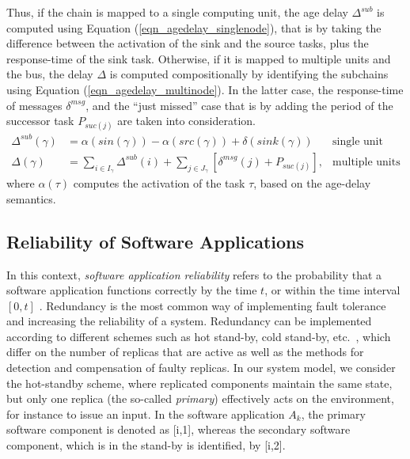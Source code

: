 Thus, if the chain is mapped to a single computing unit, the age delay  $\Delta^{sub}$ is computed using Equation (\ref{eqn_agedelay_singlenode}), that is by taking the difference between the activation of the sink and the source tasks, plus the response-time of the sink task. Otherwise, if it is mapped to multiple units and the bus, the delay $\Delta$ is computed compositionally by identifying the subchains using Equation (\ref{eqn_agedelay_multinode}). In the latter case, the response-time of messages $\delta^{msg}$, and the ``just missed'' case that is by adding the period of the successor task $P_{suc(j)}$ are  taken into consideration.
\begin{align}
	\label{eqn_agedelay_singlenode}
	\Delta^{sub}(\gamma) &= \alpha(sin(\gamma))-\alpha(src(\gamma)) + \delta(sink(\gamma)) & \text{single unit}\\
	\label{eqn_agedelay_multinode}
	\Delta(\gamma)&=\sum_{i\in I_{\gamma}}{\Delta^{sub}(i)} + \sum_{j\in  J_{\gamma}}{[\delta^{msg}(j)+P_{suc(j)}]}, &\text{multiple units}
\end{align}
where $\alpha(\tau)$ computes the activation of the task $\tau$, based on the age-delay semantics.

\subsection{Reliability of Software Applications}\label{sub_reliability}
In this context, \textit{software application reliability} refers to the probability that a software application functions correctly by the time $t$, or within the time interval $[0, t]$ \cite{Goel1985SoftwareApplicability}. Redundancy is the most common way of implementing fault tolerance and increasing the reliability of a system. Redundancy can be implemented according to different schemes such as hot stand-by, cold stand-by, etc.~\cite{Dubrova2013Fault-tolerantDesign}, which differ on the number of replicas that are active as well as the methods for detection and compensation of faulty replicas. In our system model, we consider the hot-standby scheme, where replicated components maintain the same state, but only one replica (the so-called \textit{primary}) effectively acts on the environment, for instance to issue an input. In the software application $A_k$, the primary software component is denoted as [i,1], whereas the secondary software component, which is in the stand-by is identified, by [i,2].

